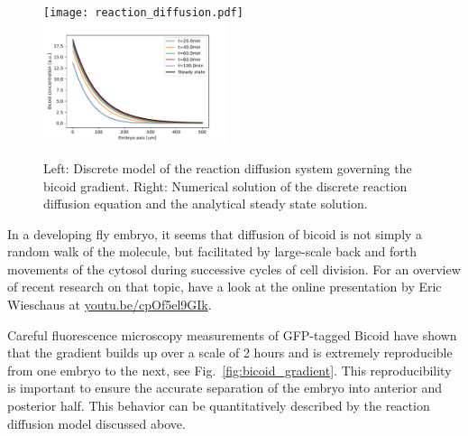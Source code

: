 \begin{figure}[tb]
	\centering
	\texttt{[image: reaction\_diffusion.pdf]}
	\includegraphics[width=0.48\textwidth]{figures/bicoid_gradient.pdf}
	\caption{Left: Discrete model of the reaction diffusion system governing the bicoid gradient.
	Right: Numerical solution of the discrete reaction diffusion equation and the analytical steady state solution.}
	\label{fig:reaction_diffusion}
\end{figure}

In a developing fly embryo, it seems that diffusion of bicoid is not simply a random walk of the molecule, but facilitated by large-scale back and forth movements of the cytosol during successive cycles of cell division.
For an overview of recent research on that topic, have a look at the online presentation by Eric Wieschaus at \href{https://youtu.be/cpOf5el9GIk}{youtu.be/cpOf5el9GIk}.

Careful fluorescence microscopy measurements of GFP-tagged Bicoid have shown that the gradient builds up over a scale of 2 hours and is extremely reproducible from one embryo to the next, see Fig.~\ref{fig:bicoid_gradient}.
This reproducibility is important to ensure the accurate separation of the embryo into anterior and posterior half.
This behavior can be quantitatively described by the reaction diffusion model discussed above.

